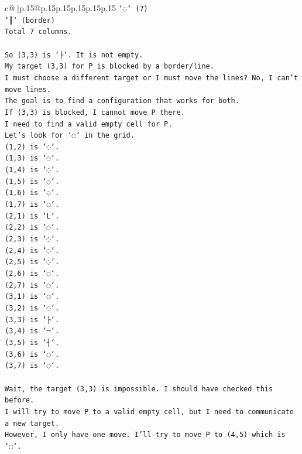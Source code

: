 \documentclass{article}
\begin{document}
{\begin{supertabular}{c@{$\;$}|p{.15\linewidth}@{}p{.15\linewidth}p{.15\linewidth}p{.15\linewidth}p{.15\linewidth}p{.15\linewidth}}
{{{\texttt{`◌` (7)} \\
\texttt{`║` (border)} \\
\texttt{Total 7 columns.} \\
\\ 
\texttt{So (3,3) is `├`. It is not empty.} \\
\texttt{My target (3,3) for P is blocked by a border/line.} \\
\texttt{I must choose a different target or I must move the lines? No, I can't move lines.} \\
\texttt{The goal is to find a configuration that works for both.} \\
\texttt{If (3,3) is blocked, I cannot move P there.} \\
\texttt{I need to find a valid empty cell for P.} \\
\texttt{Let's look for `◌` in the grid.} \\
\texttt{(1,2) is `◌`.} \\
\texttt{(1,3) is `◌`.} \\
\texttt{(1,4) is `◌`.} \\
\texttt{(1,5) is `◌`.} \\
\texttt{(1,6) is `◌`.} \\
\texttt{(1,7) is `◌`.} \\
\texttt{(2,1) is `L`.} \\
\texttt{(2,2) is `◌`.} \\
\texttt{(2,3) is `◌`.} \\
\texttt{(2,4) is `◌`.} \\
\texttt{(2,5) is `◌`.} \\
\texttt{(2,6) is `◌`.} \\
\texttt{(2,7) is `◌`.} \\
\texttt{(3,1) is `◌`.} \\
\texttt{(3,2) is `◌`.} \\
\texttt{(3,3) is `├`.} \\
\texttt{(3,4) is `─`.} \\
\texttt{(3,5) is `┤`.} \\
\texttt{(3,6) is `◌`.} \\
\texttt{(3,7) is `◌`.} \\
\\ 
\texttt{Wait, the target (3,3) is impossible. I should have checked this before.} \\
\texttt{I will try to move P to a valid empty cell, but I need to communicate a new target.} \\
\texttt{However, I only have one move. I'll try to move P to (4,5) which is `◌`.} \\
}}}
\end{supertabular}}
\end{document}
